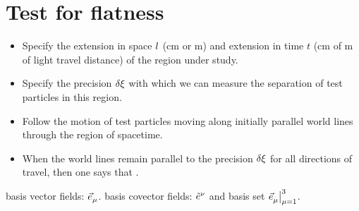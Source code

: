 \section{Test for flatness}
%
\begin{itemize}
  \item Specify the extension in space $l$ (\si{cm} or \si{m}) and extension in time $t$ (\si{cm} of \si{m} of light travel distance) of the region under study.
  \item Specify the precision $\delta\xi$ with which we can measure the separation of test particles in this region.
  \item Follow the motion of test particles moving along initially parallel world lines through the region of spacetime.
  \item When the world lines remain parallel to the precision $\delta\xi$ for all directions of travel, then one says that .
\end{itemize}


basis vector fields: $\tbvec\mu$. basis covector fields: $\tbcov\nu$ and basis set $\bset{\tbvec\mu}{\mu = 1}{3}$.

